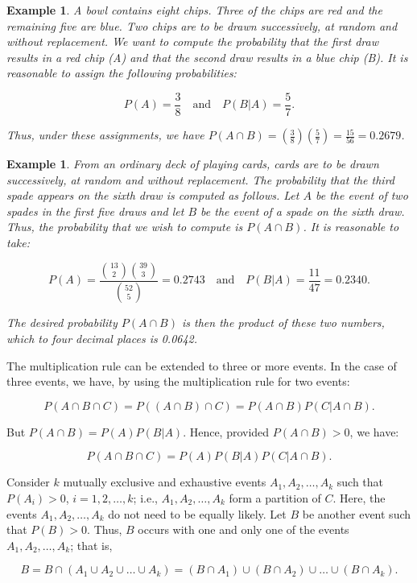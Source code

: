 \documentclass[12pt]{article}
\newtheorem{example}[theorem]{Example}
\newcommand{\1}{{\bf 1}}
\newcommand{\2}{{\bf 2}}
\begin{document}
\begin{example}
A bowl contains eight chips. Three of the chips are red and the remaining five are blue. Two chips are to be drawn successively, at random and without replacement. We want to compute the probability that the first draw results in a red chip (A) and that the second draw results in a blue chip (B). It is reasonable to assign the following probabilities:

\[ P(A) = \frac{3}{8} \quad \text{and} \quad P(B|A) = \frac{5}{7}. \]

Thus, under these assignments, we have \( P(A \cap B) = \left(\frac{3}{8}\right) \left(\frac{5}{7}\right) = \frac{15}{56} = 0.2679 \).
\end{example}
\begin{example}
From an ordinary deck of playing cards, cards are to be drawn successively, at random and without replacement. The probability that the third spade appears on the sixth draw is computed as follows. Let $A$ be the event of two spades in the first five draws and let $B$ be the event of a spade on the sixth draw. Thus, the probability that we wish to compute is $P(A \cap B)$. It is reasonable to take:

\[ P(A) = \frac{{\binom{13}{2} \binom{39}{3}}}{{\binom{52}{5}}} = 0.2743 \quad \text{and} \quad P(B|A) = \frac{11}{47} = 0.2340. \]

The desired probability $P(A \cap B)$ is then the product of these two numbers, which to four decimal places is 0.0642.
\end{example}
The multiplication rule can be extended to three or more events. In the case of three events, we have, by using the multiplication rule for two events:

\[ P(A \cap B \cap C) = P((A \cap B) \cap C) = P(A \cap B)P(C|A \cap B). \]

But $P(A \cap B) = P(A)P(B|A)$. Hence, provided $P(A \cap B) > 0$, we have:

\[ P(A \cap B \cap C) = P(A)P(B|A)P(C|A \cap B). \]

Consider $k$ mutually exclusive and exhaustive events $A_1, A_2, \ldots, A_k$ such that $P(A_i) > 0$, $i = 1, 2, \ldots, k$; i.e., $A_1, A_2, \ldots, A_k$ form a partition of $C$. Here, the events $A_1, A_2, \ldots, A_k$ do not need to be equally likely. Let $B$ be another event such that $P(B) > 0$. Thus, $B$ occurs with one and only one of the events $A_1, A_2, \ldots, A_k$; that is,

\[ B = B \cap (A_1 \cup A_2 \cup \ldots \cup A_k) = (B \cap A_1) \cup (B \cap A_2) \cup \ldots \cup (B \cap A_k). \]
\end{document}
